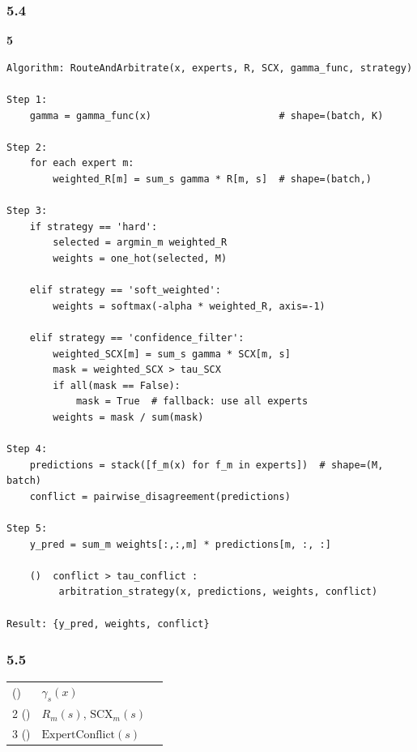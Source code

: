\documentclass[
  12pt,
]{article}
\begin{document}
\subsubsection{5.4 }\label{ux5b9eux73b0ux65b9ux6cd5-4}

\textbf{ 5}

\begin{verbatim}
Algorithm: RouteAndArbitrate(x, experts, R, SCX, gamma_func, strategy)

Step 1: 
    gamma = gamma_func(x)                      # shape=(batch, K)

Step 2: 
    for each expert m:
        weighted_R[m] = sum_s gamma * R[m, s]  # shape=(batch,)

Step 3: 
    if strategy == 'hard':
        selected = argmin_m weighted_R
        weights = one_hot(selected, M)

    elif strategy == 'soft_weighted':
        weights = softmax(-alpha * weighted_R, axis=-1)

    elif strategy == 'confidence_filter':
        weighted_SCX[m] = sum_s gamma * SCX[m, s]
        mask = weighted_SCX > tau_SCX
        if all(mask == False):
            mask = True  # fallback: use all experts
        weights = mask / sum(mask)

Step 4: 
    predictions = stack([f_m(x) for f_m in experts])  # shape=(M, batch)
    conflict = pairwise_disagreement(predictions)

Step 5: 
    y_pred = sum_m weights[:,:,m] * predictions[m, :, :]

    ()  conflict > tau_conflict :
         arbitration_strategy(x, predictions, weights, conflict)

Result: {y_pred, weights, conflict}
\end{verbatim}

\subsubsection{5.5
}\label{ux4e0eux5176ux4ed6ux6a21ux5757ux7684ux534fux8c03-4}

\begin{longtable}[]{@{}lll@{}}
\toprule\noalign{}
 &  &  \\
\midrule\noalign{}
\endhead
\bottomrule\noalign{}
\endlastfoot
 1 () & \(\gamma_s(x)\) &  \\
 2 () & \(R_m(s)\), \(\text{SCX}_m(s)\) &
 \\
 3 () & \(\text{ExpertConflict}(s)\) &  \\
\end{longtable}
\end{document}

